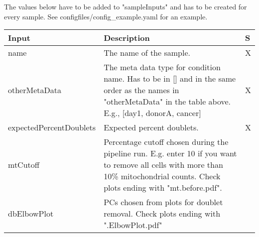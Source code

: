 \newpage

The values below have to be added to "sampleInputs" and has to be created for every sample. See configfiles/config\_example.yaml for an example.

\begin{tabular}{p{4cm} | p{9.5cm} | p{0.1cm}}
	Input & Description & S\\
	\hline
	name & The name of the sample. & X\\
	otherMetaData & The meta data type for condition name. Has to be in [] and in the same order as the names in "otherMetaData" in the table above. E.g., [day1, donorA, cancer] & X\\
	expectedPercentDoublets & Expected percent doublets. & X\\
	mtCutoff & Percentage cutoff chosen during the pipeline run. E.g. enter 10 if you want to remove all cells with more than 10\% mitochondrial counts. Check plots ending with "mt.before.pdf". & \\
	dbElbowPlot & PCs chosen from plots for doublet removal. Check plots ending with ".ElbowPlot.pdf" & \\
\end{tabular}
